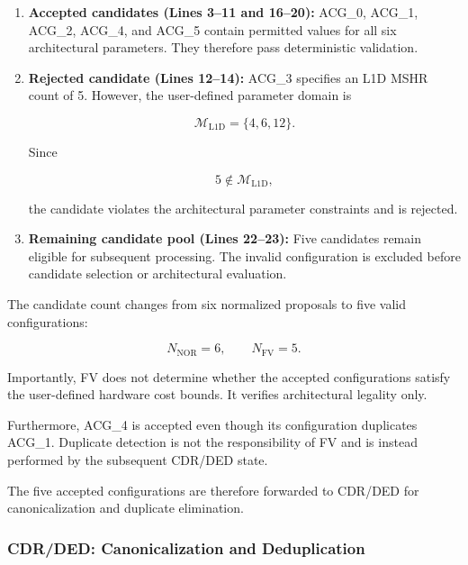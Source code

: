 \begin{enumerate}

\item \textbf{Accepted candidates (Lines 3--11
and 16--20):}
ACG\_0, ACG\_1, ACG\_2, ACG\_4, and ACG\_5
contain permitted values for all six
architectural parameters. They therefore
pass deterministic validation.

\item \textbf{Rejected candidate (Lines 12--14):}
ACG\_3 specifies an L1D MSHR count of 5.
However, the user-defined parameter domain is

\begin{equation}
\mathcal{M}_{\mathrm{L1D}} = \{4,6,12\}.
\end{equation}

Since

\begin{equation}
5 \notin \mathcal{M}_{\mathrm{L1D}},
\end{equation}

the candidate violates the architectural
parameter constraints and is rejected.

\item \textbf{Remaining candidate pool
(Lines 22--23):}
Five candidates remain eligible for
subsequent processing. The invalid
configuration is excluded before
candidate selection or architectural
evaluation.

\end{enumerate}

The candidate count changes from six
normalized proposals to five valid
configurations:

\begin{equation}
N_{\mathrm{NOR}} = 6,
\qquad
N_{\mathrm{FV}} = 5.
\end{equation}

Importantly, FV does not determine whether
the accepted configurations satisfy the
user-defined hardware cost bounds.
It verifies architectural legality only.

Furthermore, ACG\_4 is accepted even though
its configuration duplicates ACG\_1.
Duplicate detection is not the responsibility
of FV and is instead performed by the
subsequent CDR/DED state.

The five accepted configurations are
therefore forwarded to CDR/DED for
canonicalization and duplicate elimination.


\subsubsection{CDR/DED: Canonicalization and Deduplication}
\label{app:illustrative_cdr}

